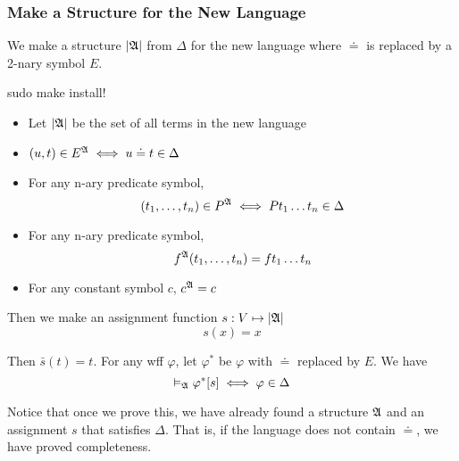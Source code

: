 \subsubsection{Make a Structure for the New Language}

We make a structure $|\mathfrak{A}|$ from $\Delta$ for the new language where $\doteq$ is replaced by a 2-nary symbol $E$.

sudo make install!

\begin{itemize}
    \item Let $|\mathfrak{A}|$ be the set of all terms in the new language
    \item $(u,t)\in E^{\mathfrak{A}} \iff u\doteq t \in \Delta$
    \item For any n-ary predicate symbol,
    \[ (t_1,\dots,t_n) \in P^{\mathfrak{A}} \iff Pt_1\dots t_n \in \Delta \]
    \item For any n-ary predicate symbol,
    \[ f^{\mathfrak{A}} (t_1,\dots,t_n) = ft_1\dots t_n \]
    \item For any constant symbol $c$, $c^{\mathfrak{A}}=c$
\end{itemize}

Then we make an assignment function $s:V\mapsto|\mathfrak{A}|$
\[ s(x)=x \]

Then $\bar{s}(t)=t$. For any wff $\varphi$, let $\varphi^*$ be $\varphi$ with $\doteq$ replaced by $E$. We have
\[ \vDash_{\mathfrak{A}}\varphi^*[s] \iff \varphi\in\Delta \]

Notice that once we prove this, we have already found a structure $\mathfrak{A}$ and an assignment $s$ that satisfies $\Delta$. That is, if the language does not contain $\doteq$, we have proved completeness.

